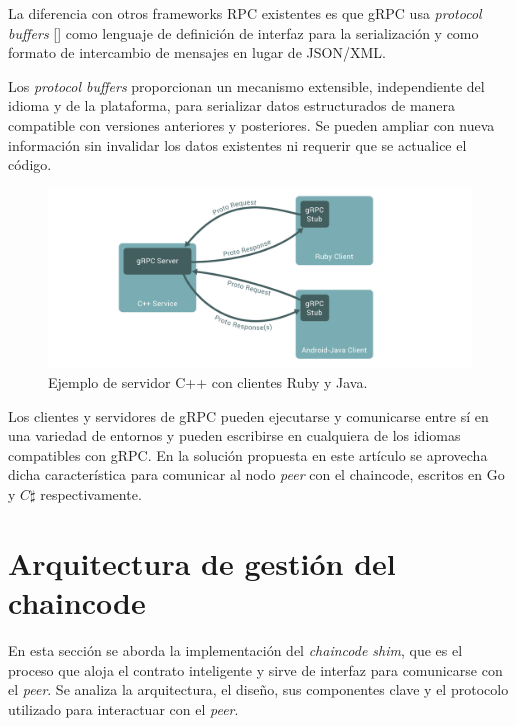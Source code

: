 La diferencia con otros frameworks RPC existentes es que gRPC usa \textit{protocol buffers} [\cite{protobuf-doc}] como lenguaje de definición de interfaz para la serialización y como formato de intercambio de mensajes en lugar de JSON/XML.

Los \textit{protocol buffers} proporcionan un mecanismo extensible, independiente del idioma y de la plataforma, para serializar datos estructurados de manera compatible con versiones anteriores y posteriores. Se pueden ampliar con nueva información sin invalidar los datos existentes ni requerir que se actualice el código.

\begin{figure}[tbph]
\centering
\includegraphics[width=\textwidth]{Images/grpc}
\caption{ Ejemplo de servidor C++ con clientes Ruby y Java.}
\label{fig:grpc}
\end{figure}

Los clientes y servidores de gRPC pueden ejecutarse y comunicarse entre sí en una variedad de entornos y pueden escribirse en cualquiera de los idiomas compatibles con gRPC. En la solución propuesta en este artículo se aprovecha dicha característica para comunicar al nodo \textit{peer} con el chaincode, escritos en Go y $ C\sharp$ respectivamente.


\section{Arquitectura de gestión del chaincode}

En esta sección se aborda la implementación del \textit{chaincode shim}, que es el proceso que aloja el contrato inteligente y sirve de interfaz para comunicarse con el \textit{peer}. Se analiza la arquitectura, el diseño, sus componentes clave y el protocolo utilizado para interactuar con el \textit{peer}.

%

